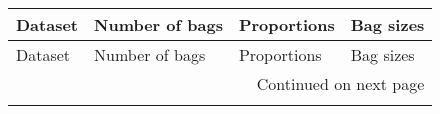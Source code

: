 \begin{longtable}{llll}
\toprule
                                                                                                      Dataset & Number of bags &                                                                                                                                                                                                                                                                                               Proportions &                                                                                                                                                                                                                                                                                                 Bag sizes \\
\midrule
\endfirsthead

\toprule
                                                                                                      Dataset & Number of bags &                                                                                                                                                                                                                                                                                               Proportions &                                                                                                                                                                                                                                                                                                 Bag sizes \\
\midrule
\endhead
\midrule
\multicolumn{4}{r}{{Continued on next page}} \\
\midrule
\endfoot


\end{longtable}

